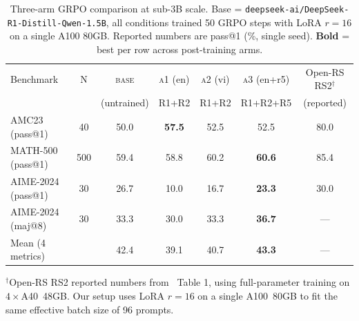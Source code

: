 \begin{table}[t]
\centering
\small
\caption{Three-arm GRPO comparison at sub-3B scale. Base = \texttt{deepseek-ai/DeepSeek-R1-Distill-Qwen-1.5B}, all conditions trained 50 GRPO steps with LoRA $r{=}16$ on a single A100 80GB. Reported numbers are pass@1 (\%, single seed). \textbf{Bold} = best per row across post-training arms.}
\label{tab:three_arm_results}
\begin{tabular}{lcccccc}
\toprule
Benchmark & N & \textsc{base} & \textsc{a1} (en) & \textsc{a2} (vi) & \textsc{a3} (en+r5) & Open-RS RS2$^\dagger$ \\
 & & (untrained) & R1+R2 & R1+R2 & R1+R2+R5 & (reported) \\
\midrule
AMC23 (pass@1)        & 40  & 50.0 & \textbf{57.5} & 52.5 & 52.5 & 80.0 \\
MATH-500 (pass@1)     & 500 & 59.4 & 58.8 & 60.2 & \textbf{60.6} & 85.4 \\
AIME-2024 (pass@1)    & 30  & 26.7 & 10.0 & 16.7 & \textbf{23.3} & 30.0 \\
AIME-2024 (maj@8)     & 30  & 33.3 & 30.0 & 33.3 & \textbf{36.7} & --- \\
\midrule
Mean (4 metrics)      &     & 42.4 & 39.1 & 40.7 & \textbf{43.3} & --- \\
\bottomrule
\end{tabular}

\medskip
\footnotesize
$^\dagger$Open-RS RS2 reported numbers from~\cite{openRS_2025} Table 1, using full-parameter
training on $4{\times}$A40~48GB. Our setup uses LoRA $r{=}16$ on a single A100~80GB
to fit the same effective batch size of 96 prompts.
\end{table}
